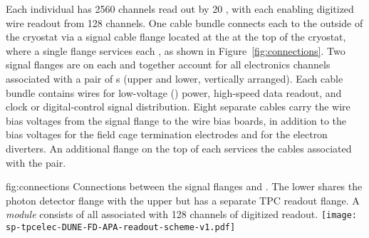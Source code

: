 Each individual  has \num{2560} channels read out by \num{20} , with
each  enabling digitized wire readout from \num{128} channels.  One cable bundle connects each  to
the outside of the cryostat via a  signal cable flange located at the  \fdth at the
top of the cryostat, where a single flange services each , as shown in Figure~\ref{fig:connections}.  Two  signal flanges are on each \fdth and together account for all electronics channels associated with a pair of s (upper and lower, vertically arranged).
Each cable bundle contains wires for low-voltage () power, high-speed data readout, and
clock or digital-control signal distribution.  Eight separate cables carry the  wire bias voltages
from the signal flange to the  wire bias boards, in addition to the bias voltages for the field
cage termination electrodes and for the electron diverters.  An additional flange on the top of each \fdth services the  cables associated with the  pair.

\begin{dunefigure}
{fig:connections}
{Connections between the signal flanges and . The lower  shares the photon detector flange with the upper  but has a separate TPC readout flange. A \textit{ module} consists of all  associated with \num{128} channels of digitized readout.}
\texttt{[image: sp-tpcelec-DUNE-FD-APA-readout-scheme-v1.pdf]}
\end{dunefigure}

